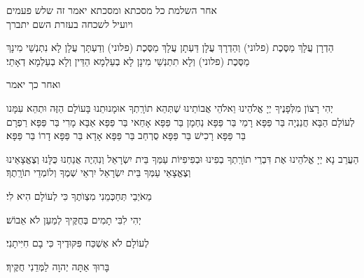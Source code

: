 \clearpage

\thispagestyle{empty}
\centerlastline
\small
\parskip 1pt
{\centering
  \scriptsize
   אחר השלמת כל מסכתא ומסכתא יאמר זה שלש פעמים\\ ויועיל לשכחה בעזרת השם יתברך\hdot
}

הַדְרָן עֲלָךְ מַסֶּכֶת {\scriptsize(פלוני)} וְהַדְרָךְ עֲלָן\hdot
דַּעְתָן עֲלָךְ מַסֶּכֶת {\scriptsize(פלוני)} וְדַעְתָּך עֲלָן\hdot
לָא נִתְנְשֵׁי מִינָךְ מַסֶּכֶת {\scriptsize(פלוני}) וְלָא תִתְנְשֵׁי מִינָן
לָא בְעַלְמָא הַדֵּין וְלָא בְעַלְמָא דְאָתֵי׃

\vspace*{1em}

{\scriptsize ואחר כך יאמר}

יְהִי רָצוֹן מִלְּפָנֶיךָ יְיָ אֱלֹהֵינוּ וֵאלֹהֵי אֲבוֹתֵינוּ שֶׁתְּהֵא תוֹרָֽתְךָ אוּמָנוּתֵנוּ בָּעוֹלָם הַזֶּה וּתְהֵא עִמָּנו לְעוֹלָם הַבָּא\hdot
חֲנַנְיָה בַּר פַּפָּא\hdot
רָמֵי בַּר פַּפָּא\hdot
נַחְמָן בַּר פַּפָּא\hdot
אָחַאי בַּר פַּפָּא\hdot
אַבָּא מָרִי בַּר פַּפָּא\hdot
רַפְרָם בַּר פַּפָּא\hdot
רָכִישׁ בַּר פַּפָּא\hdot
סֻרְחַב בַּר פַּפָּא\hdot
אָדָא בַּר פַּפָּא\hdot
דָרוֹ בַּר פַּפָּא׃

\vspace*{1em}

הַעֲרֵב נָא יְיָ אֱלֹהֵינוּ אֶת דִּבְרֵי תוֹרָֽתְךָ בְפִינוּ וּבְפִיפִיּוֹת עַמְּךָ בֵּית יִשְׂרָאֵל וְנִהְיֶה אֲנַחְנוּ כֻּלָּנוּ וְצֶאֱצָאֵינוּ וְצֶאֱצָאֵי עַמְּךָ בֵּית יִשְׂרָאֵל יִרְאֵי שְׁמֶךָ וְלוֹמְדֵי תוֹרָֽתֶךָ׃

מֵאֹיְבַי תְּחַכְּמֵנִי מִצְוֺתֶךָ כִּי לְעוֹלָם הִיא לִי׃

יְהִי לִבִּי תָמִים בְּחֻקֶּיךָ לְמַעַן לֹא אֵבוֹשׁ׃

לְעוֹלָם לֹא אֶשְׁכַּח פִּקּוּדֶיךָ כִּי בָם חִיִּיתָנִי׃

  בָּרוּךְ אַתָּה יְהוָה לַמְּדֵנִי חֻקֶּיךָ׃

